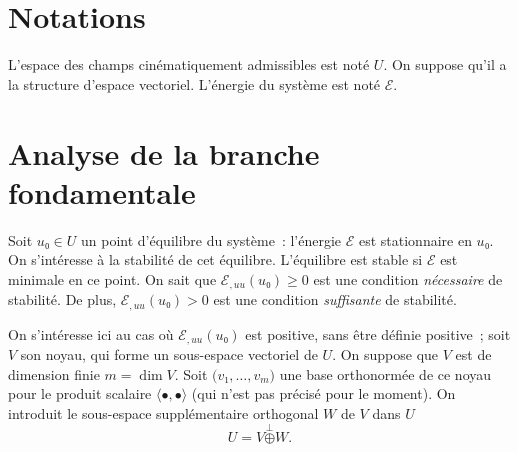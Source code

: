 \documentclass[12pt, final]{amsart}
\begin{document}
\title{\mytitle}
\author{\myauthor}
\address{\myaddress}

\begin{abstract}
  blabla
\end{abstract}


\maketitle


\section{Notations}

L'espace des champs cinématiquement admissibles est noté \(U\). On suppose
qu'il a la structure d'espace vectoriel. L'énergie du système est noté
\(ℰ\).

\section{Analyse de la branche fondamentale}

Soit \(u₀\in U\) un point d'équilibre du système~: l'énergie \(ℰ\)
est stationnaire en \(u₀\). On s'intéresse à la stabilité de cet
équilibre. L'équilibre est stable si \(ℰ\) est minimale en ce
point. On sait que \(ℰ_{,uu}(u₀)≥0\) est une condition
\emph{nécessaire} de stabilité. De plus, \(ℰ_{,uu}(u₀)>0\) est une
condition \emph{suffisante} de stabilité.

On s'intéresse ici au cas où \(ℰ_{,uu}(u₀)\) est positive, sans être
définie positive~; soit \(V\) son noyau, qui forme un sous-espace vectoriel de
\(U\). On suppose que \(V\) est de dimension finie \(m=\dim V\). Soit
\(\bigl(v₁, \ldots, v_m\bigr)\) une base orthonormée de ce noyau pour le
produit scalaire \(〈•,•〉\) (qui n'est pas précisé pour
le moment). On introduit le sous-espace supplémentaire orthogonal \(W\) de
\(V\) dans \(U\)
\begin{equation}
  U=V\stackrel⟂⊕W.
\end{equation}
\end{document}
